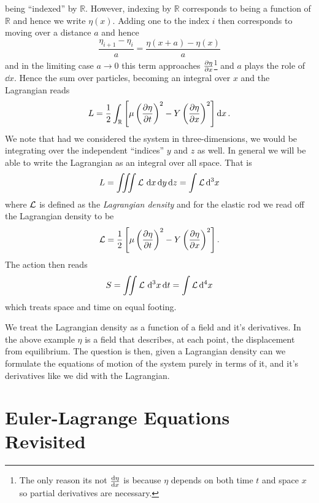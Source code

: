 being ``indexed'' by \(\mathbb{R}\). However, indexing by \(\mathbb{R}\)
corresponds to being a function of \(\mathbb{R}\) and hence we write
\(\eta(x)\). Adding one to the index \(i\) then corresponds to moving over a
distance \(a\) and hence
\begin{equation}
    \frac{\eta_{i + 1} - \eta_i}{a} = \frac{\eta(x + a) - \eta(x)}{a}
\end{equation}
and in the limiting case \(a\to 0\) this term approaches
\(\pdv{\eta}{x}\)\footnote{The only reason its not \(\dv{\eta}{x}\) is because
    \(\eta\) depends on both time \(t\) and space \(x\) so partial derivatives are
    necessary.} and \(a\) plays the role of \(\dd{x}\). Hence the sum over
particles, becoming an integral over \(x\) and the Lagrangian reads
\begin{equation}\label{eq:contLag}
    L = \frac{1}{2}\int_\mathbb{R}\left[\mu\left(\pdv{\eta}{t}\right)^2 - Y\left(\pdv{\eta}{x}\right)^2\right]\dd{x}.
\end{equation}
We note that had we considered the system in three-dimensions, we would be
integrating over the independent ``indices'' \(y\) and \(z\) as well. In general
we will be able to write the Lagrangian as an integral over all space. That is
\begin{equation}\label{eq:lagDens}
    L = \iiint\mathcal{L}\,\dd{x}\dd{y}\dd{z} = \int\mathcal{L} \dd[3]{x}
\end{equation}
where \(\mathcal{L}\) is defined as the \textit{Lagrangian density} and for the elastic
rod we read off the Lagrangian density to be
\begin{equation}
    \mathcal{L} = \frac{1}{2}\left[\mu\left(\pdv{\eta}{t}\right)^2 - Y\left(\pdv{\eta}{x}\right)^2\right].
\end{equation}
The action then reads
\begin{equation}
    S = \iint\mathcal{L}\,\dd[3]{x}\dd{t} = \int\mathcal{L}\dd[4]{x}
\end{equation}
which treats space and time on equal footing.

We treat the Lagrangian density as a function of a field and it's derivatives.
In the above example \(\eta\) is a field that describes, at each point, the
displacement from equilibrium. The question is then, given a Lagrangian density
can we formulate the equations of motion of the system purely in terms of it,
and it's derivatives like we did with the Lagrangian.

\section{Euler-Lagrange Equations Revisited}

